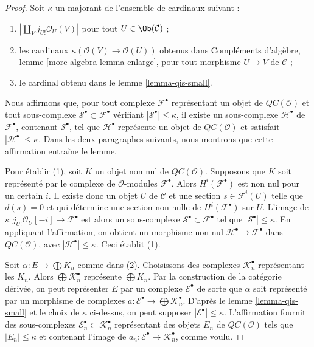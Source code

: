 \begin{proof}
Soit $\kappa$ un majorant de l'ensemble de cardinaux suivant :
\begin{enumerate}
\item $|\coprod_V j_{U!}\mathcal{O}_U(V)|$ pour tout
$U \in \Ob(\mathcal{C})$ ;
\item les cardinaux $\kappa(\mathcal{O}(V) \to \mathcal{O}(U))$ obtenus dans
Compléments d'algèbre, lemme \ref{more-algebra-lemma-enlarge}, pour tout morphisme
$U \to V$ de $\mathcal{C}$ ;
\item le cardinal obtenu dans le lemme \ref{lemma-qis-small}.
\end{enumerate}
Nous affirmons que, pour tout complexe $\mathcal{F}^\bullet$ représentant un
objet de $\mathit{QC}(\mathcal{O})$ et tout sous-complexe
$\mathcal{S}^\bullet \subset \mathcal{F}^\bullet$ vérifiant
$|\mathcal{S}^\bullet| \leq \kappa$, il existe un sous-complexe
$\mathcal{H}^\bullet$ de $\mathcal{F}^\bullet$, contenant
$\mathcal{S}^\bullet$, tel que $\mathcal{H}^\bullet$ représente un objet de
$\mathit{QC}(\mathcal{O})$ et satisfait
$|\mathcal{H}^\bullet| \leq \kappa$. Dans les deux paragraphes suivants,
nous montrons que cette affirmation entraîne le lemme.

\medskip\noindent
Pour établir (1), soit $K$ un objet non nul de
$\mathit{QC}(\mathcal{O})$. Supposons que $K$ soit représenté par le complexe
de $\mathcal{O}$-modules $\mathcal{F}^\bullet$. Alors
$H^i(\mathcal{F}^\bullet)$ est non nul pour un certain $i$. Il existe donc un
objet $U$ de $\mathcal{C}$ et une section
$s \in \mathcal{F}^i(U)$ telle que $d(s) = 0$ et qui détermine une section non
nulle de $H^i(\mathcal{F}^\bullet)$ sur $U$. L'image de
$s : j_{U!}\mathcal{O}_U[-i] \to \mathcal{F}^\bullet$ est alors un
sous-complexe $\mathcal{S}^\bullet \subset \mathcal{F}^\bullet$ tel que
$|\mathcal{S}^\bullet| \leq \kappa$. En appliquant l'affirmation, on obtient
un morphisme non nul $\mathcal{H}^\bullet \to \mathcal{F}^\bullet$ dans
$\mathit{QC}(\mathcal{O})$, avec
$|\mathcal{H}^\bullet| \leq \kappa$. Ceci établit (1).

\medskip\noindent
Soit $\alpha : E \to \bigoplus K_n$ comme dans (2). Choisissons des complexes
$\mathcal{K}_n^\bullet$ représentant les $K_n$. Alors
$\bigoplus \mathcal{K}_n^\bullet$ représente $\bigoplus K_n$. Par la
construction de la catégorie dérivée, on peut représenter $E$ par un complexe
$\mathcal{E}^\bullet$ de sorte que $\alpha$ soit représenté par un morphisme
de complexes
$a : \mathcal{E}^\bullet \to \bigoplus \mathcal{K}_n^\bullet$.
D'après le lemme \ref{lemma-qis-small} et le choix de $\kappa$ ci-dessus, on
peut supposer $|\mathcal{E}^\bullet| \leq \kappa$. L'affirmation fournit des
sous-complexes $\mathcal{E}_n^\bullet \subset \mathcal{K}_n^\bullet$
représentant des objets $E_n$ de $\mathit{QC}(\mathcal{O})$ tels que
$|E_n| \leq \kappa$ et contenant l'image de
$a_n : \mathcal{E}^\bullet \to \mathcal{K}_n^\bullet$, comme voulu.


\end{proof}
